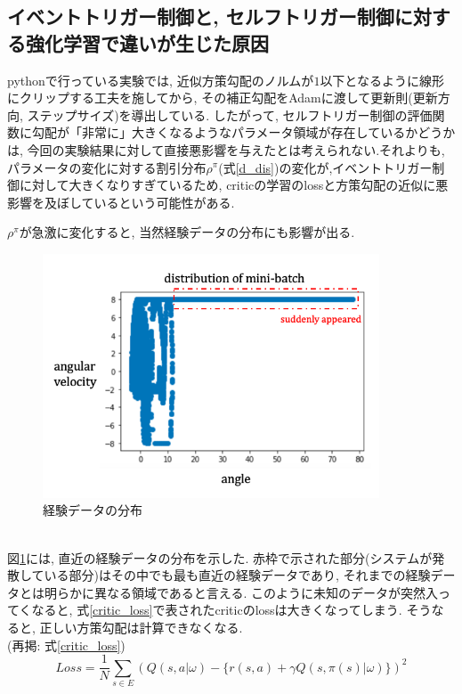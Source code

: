 \documentclass{jsarticle}
\begin{document}
\subsection{イベントトリガー制御と, セルフトリガー制御に対する強化学習で違いが生じた原因}
pythonで行っている実験では, 近似方策勾配のノルムが$1$以下となるように線形にクリップする工夫を施してから, その補正勾配をAdamに渡して更新則(更新方向, ステップサイズ)を導出している.
したがって, セルフトリガー制御の評価関数に勾配が「非常に」大きくなるようなパラメータ領域が存在しているかどうかは, 今回の実験結果に対して直接悪影響を与えたとは考えられない.それよりも, パラメータの変化に対する割引分布$\rho^{\pi}$(式\eqref{d_dis})の変化が,イベントトリガー制御に対して大きくなりすぎているため, criticの学習のlossと方策勾配の近似に悪影響を及ぼしているという可能性がある. \par
$\rho^{\pi}$が急激に変化すると, 当然経験データの分布にも影響が出る.
\begin{figure}[h]
	\centering
 	\includegraphics[width=10cm]{mini_batch.png}
 	\caption{経験データの分布} \label{mini_batch}
\end{figure}\\
図\ref{mini_batch}には, 直近の経験データの分布を示した. 赤枠で示された部分(システムが発散している部分)はその中でも最も直近の経験データであり, それまでの経験データとは明らかに異なる領域であると言える. このように未知のデータが突然入ってくなると, 式\eqref{critic_loss}で表されたcriticのlossは大きくなってしまう. そうなると, 正しい方策勾配は計算できなくなる.
\\
(再掲: 式\eqref{critic_loss})
\begin{equation*}
	Loss = \frac{1}{N}\sum_{s\in E} (Q(s,a|\omega) - \{r(s,a)+\gamma Q(s,\pi(s)|\omega)\})^2
\end{equation*}
\end{document}
